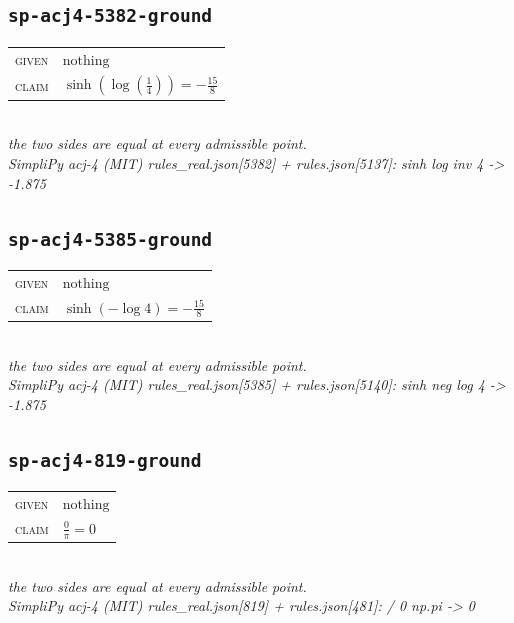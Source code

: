 \documentclass[11pt]{article}
\begin{document}
\subsection*{\texttt{sp-acj4-5382-ground}}
\begin{tabular}{@{}l@{\quad}l@{}}
\textsc{given} & $\text{nothing}$ \\[4pt]
\textsc{claim} & $\displaystyle \sinh\left(\log\left(\frac{1}{4}\right)\right) = -\frac{15}{8}$ \\
\end{tabular}\\[2pt]
{\small\emph{the two sides are equal at every admissible point.}}\\
\emph{SimpliPy acj-4 (MIT) rules\_real.json[5382] + rules.json[5137]: sinh log inv 4  ->  -1.875}\\

\subsection*{\texttt{sp-acj4-5385-ground}}
\begin{tabular}{@{}l@{\quad}l@{}}
\textsc{given} & $\text{nothing}$ \\[4pt]
\textsc{claim} & $\displaystyle \sinh\left(-\log 4\right) = -\frac{15}{8}$ \\
\end{tabular}\\[2pt]
{\small\emph{the two sides are equal at every admissible point.}}\\
\emph{SimpliPy acj-4 (MIT) rules\_real.json[5385] + rules.json[5140]: sinh neg log 4  ->  -1.875}\\

\subsection*{\texttt{sp-acj4-819-ground}}
\begin{tabular}{@{}l@{\quad}l@{}}
\textsc{given} & $\text{nothing}$ \\[4pt]
\textsc{claim} & $\displaystyle \frac{0}{\pi} = 0$ \\
\end{tabular}\\[2pt]
{\small\emph{the two sides are equal at every admissible point.}}\\
\emph{SimpliPy acj-4 (MIT) rules\_real.json[819] + rules.json[481]: / 0 np.pi  ->  0}\\
\end{document}
